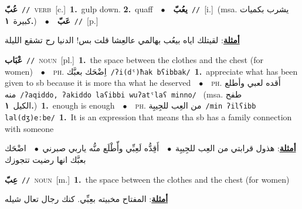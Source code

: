 \documentclass[10pt,a4paper,twoside]{article} %
\begin{document}
\begin{multicols}{2}
{\setlength\topsep{0pt}\textbf{\foreignlanguage{arabic}{عُبّ}}\ {\color{gray}\texttt{//}\color{black}}\ \textsc{verb}\ [c.]\ \textbf{1.}~gulp down.  \textbf{2.}~quaff\ \ $\bullet$\ \ \setlength\topsep{0pt}\textbf{\foreignlanguage{arabic}{يعُبّ}}\ {\color{gray}\texttt{//}\color{black}}\ [i.]\ \color{gray}(msa. \foreignlanguage{arabic}{يشرب بكميات كبيرة}~\foreignlanguage{arabic}{\textbf{١.}})\color{black}\ \ $\bullet$\ \ \setlength\topsep{0pt}\textbf{\foreignlanguage{arabic}{عَبّ}}\ {\color{gray}\texttt{//}\color{black}}\ [p.]\  \begin{flushright}\color{gray}\foreignlanguage{arabic}{\textbf{\underline{\foreignlanguage{arabic}{أمثلة}}}: لقيتلك اياه بيعُب بهالمي عالعِشا قلت بس! الدنيا رح تشقع الليلة}\end{flushright}\color{black}} \vspace{2mm}

{\setlength\topsep{0pt}\textbf{\foreignlanguage{arabic}{عْبَاب}}\ {\color{gray}\texttt{//}\color{black}}\ \textsc{noun}\ [pl.]\ \textbf{1.}~the space between the clothes and the chest (for women)\ \ $\bullet$\ \ \textsc{ph.} \color{gray} \foreignlanguage{arabic}{اِضْحَك بعبَّك}\color{black}\ {\color{gray}\texttt{/{\sffamily ʔi(dˤ)ħak bʕibbak}/}\color{black}}\ \textbf{1.}~appreciate what has been given to sb because it is more tha what he deserved\ \ $\bullet$\ \ \textsc{ph.} \color{gray} \foreignlanguage{arabic}{أَقده لعبي وأطلع منه}\color{black}\ {\color{gray}\texttt{/{\sffamily ʔaqiddo, ʔakiddo laʕibbi wuʔatˤlaʕ minno}/}\color{black}}\ \color{gray} (msa. \foreignlanguage{arabic}{طفح الكيل}~\foreignlanguage{arabic}{\textbf{١.}})\color{black}\ \textbf{1.}~enough is enough\ \ $\bullet$\ \ \textsc{ph.} \color{gray} \foreignlanguage{arabic}{من العِب للجِيبِة}\color{black}\ {\color{gray}\texttt{/{\sffamily min ʔilʕibb lal(dʒ)eːbe}/}\color{black}}\ \textbf{1.}~It is an expression that means tha sb has a family connection with someone\  \begin{flushright}\color{gray}\foreignlanguage{arabic}{\textbf{\underline{\foreignlanguage{arabic}{أمثلة}}}: هذول قرابتي من العِب للجِيبِة\ $\bullet$\ \  أَقِدُّه لَعِبِّي وأّطْلَع منُّه ياربي صبرني\ $\bullet$\ \  اضْحَك بعبَّك انها رضيت تتجوزك}\end{flushright}\color{black}} \vspace{2mm}

{\setlength\topsep{0pt}\textbf{\foreignlanguage{arabic}{عِبّ}}\ {\color{gray}\texttt{//}\color{black}}\ \textsc{noun}\ [m.]\ \textbf{1.}~the space between the clothes and the chest (for women)\  \begin{flushright}\color{gray}\foreignlanguage{arabic}{\textbf{\underline{\foreignlanguage{arabic}{أمثلة}}}: المفتاح مخبيته بعِبِّي. كنك رجال تعال شيله}\end{flushright}\color{black}} \vspace{2mm}


\end{multicols}
\end{document}
